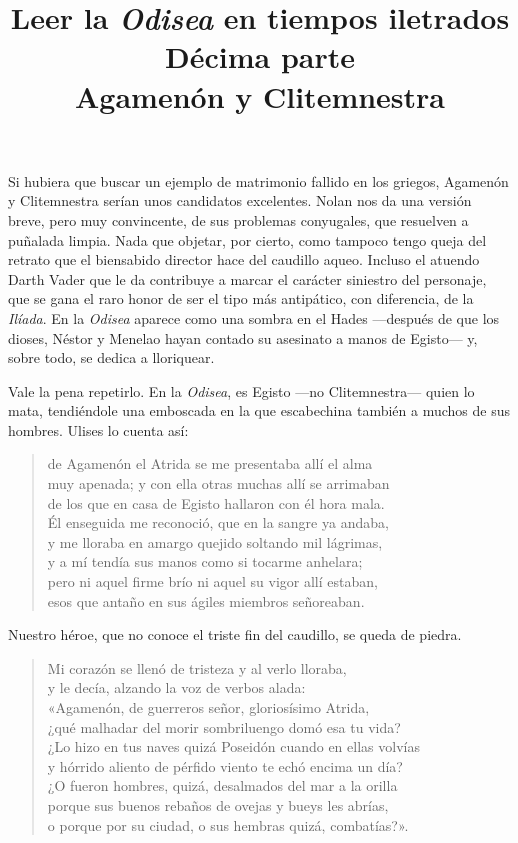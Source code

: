 \documentclass[11pt,a4paper]{article}
\title{Leer la \emph{Odisea} en tiempos iletrados \\ Décima parte \\ Agamenón y Clitemnestra}
\author{}
\date{}
\begin{document}
\maketitle

Si hubiera que buscar un ejemplo de matrimonio fallido en los griegos, Agamenón y Clitemnestra serían unos candidatos excelentes. Nolan nos da una versión breve, pero muy convincente, de sus problemas conyugales, que resuelven a puñalada limpia. Nada que objetar, por cierto, como tampoco tengo queja del retrato que el biensabido director hace del caudillo aqueo. Incluso el atuendo Darth Vader que le da contribuye a marcar el carácter siniestro del personaje, que se gana el raro honor de ser el tipo más antipático, con diferencia, de la \emph{Ilíada}. En la \emph{Odisea} aparece como una sombra en el Hades ---después de que los dioses, Néstor y Menelao hayan contado su asesinato a manos de Egisto--- y, sobre todo, se dedica a lloriquear.

Vale la pena repetirlo. En la \emph{Odisea}, es Egisto ---no Clitemnestra--- quien lo mata, tendiéndole una emboscada en la que escabechina también a muchos de sus hombres. Ulises lo cuenta así:

\begin{verse}
de Agamenón el Atrida se me presentaba allí el alma\\
muy apenada; y con ella otras muchas allí se arrimaban\\
de los que en casa de Egisto hallaron con él hora mala.\\
Él enseguida me reconoció, que en la sangre ya andaba,\\
y me lloraba en amargo quejido soltando mil lágrimas,\\
y a mí tendía sus manos como si tocarme anhelara;\\
pero ni aquel firme brío ni aquel su vigor allí estaban,\\
esos que antaño en sus ágiles miembros señoreaban.
\end{verse}

Nuestro héroe, que no conoce el triste fin del caudillo, se queda de piedra.

\begin{verse}
Mi corazón se llenó de tristeza y al verlo lloraba,\\
y le decía, alzando la voz de verbos alada:\\
«Agamenón, de guerreros señor, gloriosísimo Atrida,\\
¿qué malhadar del morir sombriluengo domó esa tu vida?\\
¿Lo hizo en tus naves quizá Poseidón cuando en ellas volvías\\
y hórrido aliento de pérfido viento te echó encima un día?\\
¿O fueron hombres, quizá, desalmados del mar a la orilla\\
porque sus buenos rebaños de ovejas y bueys les abrías,\\
o porque por su ciudad, o sus hembras quizá, combatías?».
\end{verse}
\end{document}
